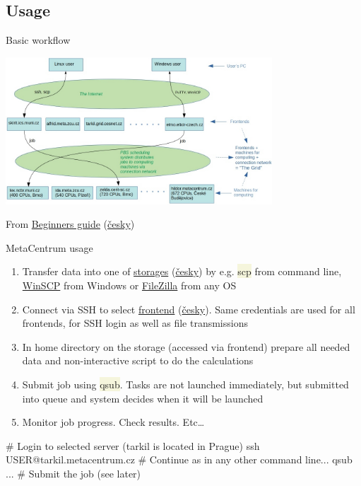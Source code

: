 \documentclass[compress, ucs, xelatex, 11pt, xcolor=svgnames, aspectratio=169,
	hyperref={
		bookmarks=true,
		unicode=true,
		colorlinks=true,
		pdftitle={Linux, command line and MetaCentrum},
		plainpages=false,
		pdfauthor={Vojtech Zeisek},
		pdfsubject={Course about use of Linux command line, writing shell scripts and using MetaCentrum of CESNET},
		pdfcreator={XeLaTeX},
		pdfkeywords={Linux, GNU, BASH, shell, command line, MetaCentrum},
		linkcolor=DarkRed, %
		anchorcolor=DarkBlue, %
		citecolor=Indigo, %
		filecolor=NavyBlue, %
		menucolor=DarkMagenta, %
		urlcolor=DarkBlue, %
		pdftex},
	url={hyphens, lowtilde} %
	]{beamer}
\renewcommand{\texttt}[1]{\colorbox{Beige}{{\ttfamily #1}}}
\begin{document}
\subsection{Usage}

\begin{frame}{Basic workflow}
	\begin{center}
		\includegraphics[height=5.5cm]{grid_graphics.jpg}
	\end{center}
	\begin{flushright}
		From \href{https://wiki.metacentrum.cz/wiki/Beginners_guide}{Beginners guide} (\href{https://wiki.metacentrum.cz/wiki/Pruvodce_pro_zacatecniky}{česky})
	\end{flushright}
\end{frame}

\begin{frame}[fragile]{MetaCentrum usage}
	\begin{enumerate}
		\item Transfer data into one of \href{https://wiki.metacentrum.cz/wiki/Working_with_data}{storages} (\href{https://wiki.metacentrum.cz/wiki/Prace_s_daty}{česky}) by e.g. \texttt{scp} from command line, \href{https://winscp.net/}{WinSCP} from Windows or \href{https://filezilla-project.org/}{FileZilla} from any OS
		\item Connect via SSH to select \href{https://wiki.metacentrum.cz/wiki/Frontend}{frontend} (\href{https://wiki.metacentrum.cz/wiki/Celni_uzel}{česky}). Same credentials are used for all frontends, for SSH login as well as file transmissions
		\item In home directory on the storage (accessed via frontend) prepare all needed data and non-interactive script to do the calculations
		\item Submit job using \texttt{qsub}. Tasks are not launched immediately, but submitted into queue and system decides when it will be launched
		\item Monitor job progress. Check results. Etc\ldots
	\end{enumerate}
	\begin{bashcode}
    # Login to selected server (tarkil is located in Prague)
    ssh USER@tarkil.metacentrum.cz
    # Continue as in any other command line...
    qsub ... # Submit the job (see later)
	\end{bashcode}
\end{frame}
\end{document}
